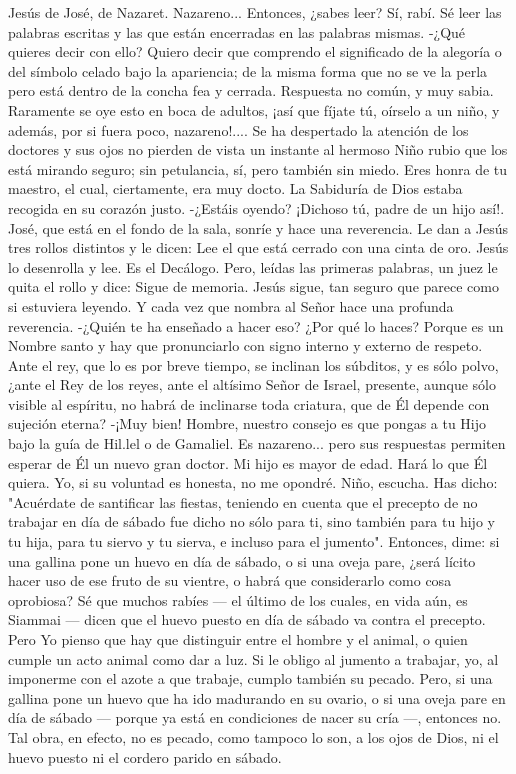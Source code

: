 \documentclass[12pt]{book} %
\begin{document}
Jesús de José, de Nazaret. 
Nazareno... Entonces, ¿sabes leer? 
Sí, rabí. Sé leer las palabras escritas y las que están encerradas en las palabras mismas. 
-¿Qué quieres decir con ello? 
Quiero decir que comprendo el significado de la alegoría o del símbolo celado bajo la apariencia; de la misma forma 
que no se ve la perla pero está dentro de la concha fea y cerrada. 
Respuesta no común, y muy sabia. Raramente se oye esto en boca de adultos, ¡así que fíjate tú, oírselo a un niño, y 
además, por si fuera poco, nazareno!.... 
Se ha despertado la atención de los doctores y sus ojos no pierden de vista un instante al hermoso Niño rubio que los 
está mirando seguro; sin petulancia, sí, pero también sin miedo. 
Eres honra de tu maestro, el cual, ciertamente, era muy docto. 
La Sabiduría de Dios estaba recogida en su corazón justo. 
-¿Estáis oyendo? ¡Dichoso tú, padre de un hijo así!. 
José, que está en el fondo de la sala, sonríe y hace una reverencia. 
 Le dan a Jesús tres rollos distintos y le dicen: 
Lee el que está cerrado con una cinta de oro. 
Jesús lo desenrolla y lee. Es el Decálogo. Pero, leídas las primeras palabras, un juez le quita el rollo y dice: 
Sigue de memoria. 
Jesús sigue, tan seguro que parece como si estuviera leyendo. Y cada vez que nombra al Señor hace una profunda 
reverencia. 
-¿Quién te ha enseñado a hacer eso? ¿Por qué lo haces? 
Porque es un Nombre santo y hay que pronunciarlo con signo interno y externo de respeto. Ante el rey, que lo es por 
breve tiempo, se inclinan los súbditos, y es sólo polvo, ¿ante el Rey de los reyes, ante el altísimo Señor de Israel, presente, aunque sólo visible al espíritu, no habrá de inclinarse toda criatura, que de Él depende con sujeción eterna? 
-¡Muy bien! Hombre, nuestro consejo es que pongas a tu Hijo bajo la guía de Hil.lel o de Gamaliel. Es nazareno... pero sus respuestas permiten esperar de Él un nuevo gran doctor. 
Mi hijo es mayor de edad. Hará lo que Él quiera. Yo, si su voluntad es honesta, no me opondré. 
Niño, escucha. Has dicho: "Acuérdate de santificar las fiestas, teniendo en cuenta que el precepto de no trabajar en 
día de sábado fue dicho no sólo para ti, sino también para tu hijo y tu hija, para tu siervo y tu sierva, e incluso para el jumento". Entonces, dime: si una gallina pone un huevo en día de sábado, o si una oveja pare, ¿será lícito hacer uso de ese fruto de su vientre, o habrá que considerarlo como cosa oprobiosa? 
Sé que muchos rabíes — el último de los cuales, en vida aún, es Siammai — dicen que el huevo puesto en día de 
sábado va contra el precepto. Pero Yo pienso que hay que distinguir entre el hombre y el animal, o quien cumple un acto animal como dar a luz. Si le obligo al jumento a trabajar, yo, al imponerme con el azote a que trabaje, cumplo también su pecado. Pero, si una gallina pone un huevo que ha ido madurando en su ovario, o si una oveja pare en día de sábado — porque ya está en condiciones de nacer su cría —, entonces no. Tal obra, en efecto, no es pecado, como tampoco lo son, a los ojos de Dios, ni el huevo puesto ni el cordero parido en sábado. 
\end{document}
